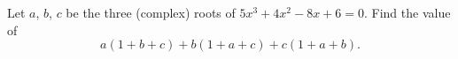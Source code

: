 Let $a$, $b$, $c$ be the three (complex) roots of $5x^3+4x^2-8x+6=0$. Find the value of
\[
a(1+b+c)+b(1+a+c)+c(1+a+b).
\]
